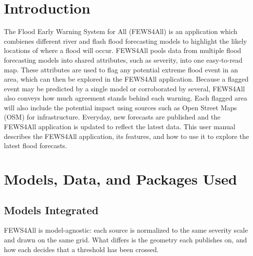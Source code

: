 %

\section*{Introduction}\label{introduction}

The Flood Early Warning System for All (FEWS4All) is an application which combienes different river and flash flood forecasting models to highlight the likely locations of where a flood will occur.
FEWS4All pools data from multiple flood forecasting models into shared attributes, such as severity, into one easy-to-read map.
These attributes are used to flag any potential extreme flood event in an area, which can then be explored in the FEWS4All application.
Because a flagged event may be predicted by a single model or corroborated by several, FEWS4All also conveys how much agreement stands behind each warning.
Each flagged area will also include the potential impact using sources such as Open Street Maps (OSM) for infrastructure.
Everyday, new forecasts are published and the FEWS4All application is updated to reflect the latest data.
This user manual describes the FEWS4All application, its features, and how to use it to explore the latest flood forecasts.


\section{Models, Data, and Packages Used}\label{models-data-and-packages-used}

\subsection{Models Integrated}\label{models-integrated}

FEWS4All is model-agnostic: each source is normalized to the same severity scale and drawn on the same grid.
What differs is the geometry each publishes on, and how each decides that a threshold has been crossed.

